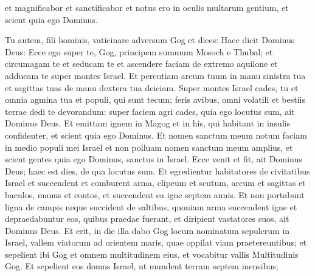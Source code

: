 \begin{biblechapter}
\begin{biblechapter}
\begin{biblechapter}
\begin{biblechapter}
\begin{biblechapter}
\begin{biblechapter}
\begin{biblechapter}
\begin{biblechapter}
\begin{biblechapter}
\begin{biblechapter}
\begin{biblechapter}
\begin{biblechapter}
\begin{biblechapter}
\begin{biblechapter}
\begin{biblechapter}
\begin{biblechapter}
\begin{biblechapter}
\begin{biblechapter}
\begin{biblechapter}
\begin{biblechapter}
\begin{biblechapter}
\begin{biblechapter}
\begin{biblechapter}
\begin{biblechapter}
\begin{biblechapter}
\begin{biblechapter}
\begin{biblechapter}
\begin{biblechapter}
\begin{biblechapter}
\begin{biblechapter}
\begin{biblechapter}
\begin{biblechapter}
\begin{biblechapter}
\begin{biblechapter}
\begin{biblechapter}
\begin{biblechapter}
\begin{biblechapter}
\begin{biblechapter}
\verse et magnificabor et sanctificabor et notus ero in oculis multarum gentium, et scient quia ego Dominus.
 
\begin{biblechapter}
\verse Tu autem, fili hominis, vaticinare adversum Gog et dices: Haec dicit Dominus Deus: Ecce ego super te, Gog, principem summum Mosoch e Thubal; 
\verse et circumagam te et seducam te et ascendere faciam de extremo aquilone et adducam te super montes Israel. 
\verse Et percutiam arcum tuum in manu sinistra tua et sagittas tuas de manu dextera tua deiciam. 
\verse Super montes Israel cades, tu et omnia agmina tua et populi, qui sunt tecum; feris avibus, omni volatili et bestiis terrae dedi te devorandum: 
\verse super faciem agri cades, quia ego locutus sum, ait Dominus Deus. 
\verse Et emittam ignem in Magog et in his, qui habitant in insulis confidenter, et scient quia ego Dominus. 
\verse Et nomen sanctum meum notum faciam in medio populi mei Israel et non polluam nomen sanctum meum amplius, et scient gentes quia ego Dominus, sanctus in Israel. 
 \verse Ecce venit et fit, ait Dominus Deus; haec est dies, de qua locutus sum.
 \verse Et egredientur habitatores de civitatibus Israel et succendent et comburent arma, clipeum et scutum, arcum et sagittas et baculos, manus et contos, et succendent ea igne septem annis. 
\verse Et non portabunt ligna de campis neque succident de saltibus, quoniam arma succendent igne et depraedabuntur eos, quibus praedae fuerant, et diripient vastatores suos, ait Dominus Deus.
 \verse Et erit, in die illa dabo Gog locum nominatum sepulcrum in Israel, vallem viatorum ad orientem maris, quae oppilat viam praetereuntibus; et sepelient ibi Gog et omnem multitudinem eius, et vocabitur vallis Multitudinis Gog. 
\verse Et sepelient eos domus Israel, ut mundent terram septem mensibus; 

\end{biblechapter}
\end{biblechapter}
\end{biblechapter}
\end{biblechapter}
\end{biblechapter}
\end{biblechapter}
\end{biblechapter}
\end{biblechapter}
\end{biblechapter}
\end{biblechapter}
\end{biblechapter}
\end{biblechapter}
\end{biblechapter}
\end{biblechapter}
\end{biblechapter}
\end{biblechapter}
\end{biblechapter}
\end{biblechapter}
\end{biblechapter}
\end{biblechapter}
\end{biblechapter}
\end{biblechapter}
\end{biblechapter}
\end{biblechapter}
\end{biblechapter}
\end{biblechapter}
\end{biblechapter}
\end{biblechapter}
\end{biblechapter}
\end{biblechapter}
\end{biblechapter}
\end{biblechapter}
\end{biblechapter}
\end{biblechapter}
\end{biblechapter}
\end{biblechapter}
\end{biblechapter}
\end{biblechapter}
\end{biblechapter}
